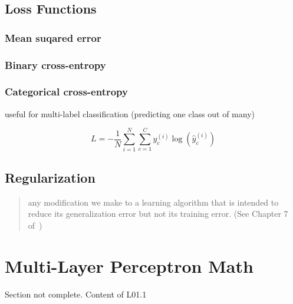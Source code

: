 \documentclass[11pt]{article}
\begin{document}

\subsection{Loss Functions}

\subsubsection{Mean suqared error}


\subsubsection{Binary cross-entropy}


\subsubsection{Categorical cross-entropy}

useful for multi-label classification (predicting one class out of many)

\begin{equation}
    L = - \frac 1 N \sum^N_{i=1}\sum^C_{c=1} y_c^{(i)}\log(\hat{y}_c^{(i)})
\end{equation}

\subsection{Regularization}

\begin{quote}
    any modiﬁcation we make to a learning algorithm that is intended to reduce its generalization error but not its training error. (See Chapter 7 of~\cite{Goodfellow-et-al-2016})
\end{quote}

\section{Multi-Layer Perceptron Math}

\begin{warning}
    Section not complete. Content of L01.1
\end{warning}

\printbibliography
\end{document}
